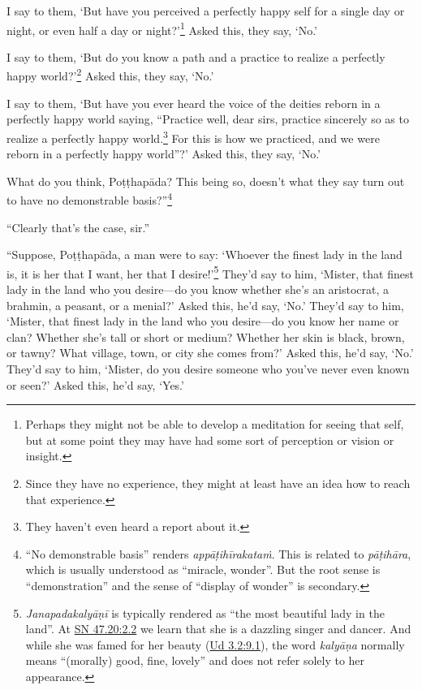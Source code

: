 \documentclass[12pt,openany]{book}%
\begin{document}
I say to them, ‘But have you perceived a perfectly happy self for a single day or night, or even half a day or night?’\footnote{Perhaps they might not be able to develop a meditation for seeing that self, but at some point they may have had some sort of perception or vision or insight. } Asked this, they say, ‘No.’ 

I say to them, ‘But do you know a path and a practice to realize a perfectly happy world?’\footnote{Since they have no experience, they might at least have an idea how to reach that experience. } Asked this, they say, ‘No.’ 

I say to them, ‘But have you ever heard the voice of the deities reborn in a perfectly happy world saying, “Practice well, dear sirs, practice sincerely so as to realize a perfectly happy world.\footnote{They haven’t even heard a report about it. } For this is how we practiced, and we were reborn in a perfectly happy world”?’ Asked this, they say, ‘No.’ 

What do you think, \textsanskrit{Poṭṭhapāda}? This being so, doesn’t what they say turn out to have no demonstrable basis?”\footnote{“No demonstrable basis” renders \textit{\textsanskrit{appāṭihīrakataṁ}}. This is related to \textit{\textsanskrit{pāṭihāra}}, which is usually understood as “miracle, wonder”. But the root sense is “demonstration” and the sense of “display of wonder” is secondary. } 

“Clearly that’s the case, sir.” 

“Suppose, \textsanskrit{Poṭṭhapāda}, a man were to say: ‘Whoever the finest lady in the land is, it is her that I want, her that I desire!’\footnote{\textit{\textsanskrit{Janapadakalyāṇī}} is typically rendered as “the most beautiful lady in the land”. At \href{https://suttacentral.net/sn47.20/en/sujato\#2.2}{SN 47.20:2.2} we learn that she is a dazzling singer and dancer. And while she was  famed for her beauty (\href{https://suttacentral.net/ud3.2/en/sujato\#9.1}{Ud 3.2:9.1}), the word \textit{\textsanskrit{kalyāṇa}} normally means “(morally) good, fine, lovely” and does not refer solely to her appearance. } They’d say to him, ‘Mister, that finest lady in the land who you desire—do you know whether she’s an aristocrat, a brahmin, a peasant, or a menial?’ Asked this, he’d say, ‘No.’ They’d say to him, ‘Mister, that finest lady in the land who you desire—do you know her name or clan? Whether she’s tall or short or medium? Whether her skin is black, brown, or tawny? What village, town, or city she comes from?’ Asked this, he’d say, ‘No.’ They’d say to him, ‘Mister, do you desire someone who you’ve never even known or seen?’ Asked this, he’d say, ‘Yes.’ 
\end{document}
